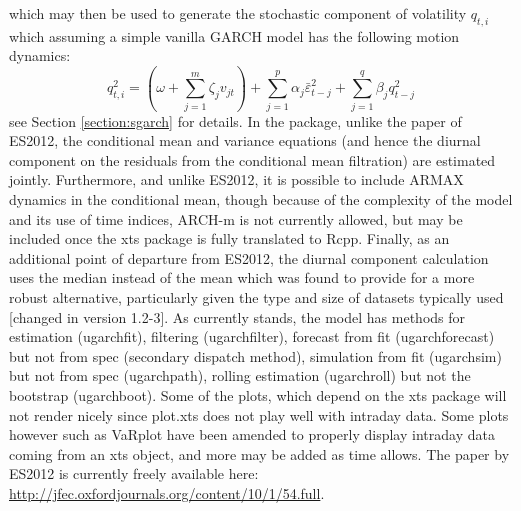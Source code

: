 which may then be used to generate the stochastic component of volatility $q_{t,i}$ which assuming a simple vanilla GARCH model has the following motion dynamics:
\begin{equation}\label{mcs4}
q_{t,i}^2 = \left( {\omega  + \sum\limits_{j = 1}^m {{\zeta _j}{v_{jt}}} } \right) + \sum\limits_{j = 1}^p {{\alpha _j}\bar \varepsilon _{t - j}^2 + } \sum\limits_{j = 1}^q {{\beta _j}q_{t - j}^2}
\end{equation}
see Section \ref{section:sgarch} for details.
In the \verb@rugarch@ package, unlike the paper of ES2012, the conditional mean and variance equations (and hence the diurnal component on the residuals from the conditional mean filtration) are estimated jointly. Furthermore, and unlike ES2012, it is possible to include ARMAX dynamics in the conditional mean, though because of the complexity of the model and its use of time indices, ARCH-m is not currently allowed, but may be included once the xts package is fully translated to Rcpp. Finally, as an additional point of departure from ES2012, the diurnal component calculation uses the median instead of the mean which was found to provide for a more robust alternative, particularly given the type and size of datasets typically used [changed in version 1.2-3].
As currently stands, the model has methods for estimation (ugarchfit), filtering (ugarchfilter), forecast from fit (ugarchforecast) but not from spec (secondary dispatch method), simulation from fit (ugarchsim) but not from spec (ugarchpath), rolling estimation (ugarchroll) but not the bootstrap (ugarchboot). Some of the plots, which depend on the xts package will not render nicely since plot.xts does not play well with intraday data. Some plots however such as VaRplot have been amended to properly display intraday data coming from an xts object, and more may be added as time allows.
The paper by ES2012 is currently freely available here: \url{http://jfec.oxfordjournals.org/content/10/1/54.full}.

